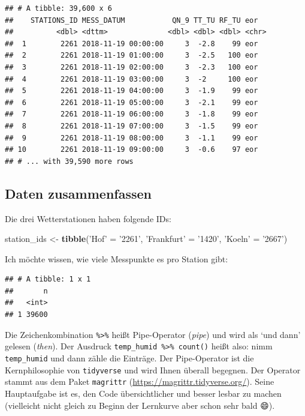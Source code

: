 \documentclass[]{book}
\newenvironment{Shaded}{\begin{snugshade}}{\end{snugshade}}
\newcommand{\KeywordTok}[1]{\textcolor[rgb]{0.13,0.29,0.53}{\textbf{#1}}}
\newcommand{\NormalTok}[1]{#1}
\newcommand{\OperatorTok}[1]{\textcolor[rgb]{0.81,0.36,0.00}{\textbf{#1}}}
\newcommand{\StringTok}[1]{\textcolor[rgb]{0.31,0.60,0.02}{#1}}
\begin{document}
\begin{verbatim}
## # A tibble: 39,600 x 6
##    STATIONS_ID MESS_DATUM           QN_9 TT_TU RF_TU eor  
##          <dbl> <dttm>              <dbl> <dbl> <dbl> <chr>
##  1        2261 2018-11-19 00:00:00     3  -2.8    99 eor  
##  2        2261 2018-11-19 01:00:00     3  -2.5   100 eor  
##  3        2261 2018-11-19 02:00:00     3  -2.3   100 eor  
##  4        2261 2018-11-19 03:00:00     3  -2     100 eor  
##  5        2261 2018-11-19 04:00:00     3  -1.9    99 eor  
##  6        2261 2018-11-19 05:00:00     3  -2.1    99 eor  
##  7        2261 2018-11-19 06:00:00     3  -1.8    99 eor  
##  8        2261 2018-11-19 07:00:00     3  -1.5    99 eor  
##  9        2261 2018-11-19 08:00:00     3  -1.1    99 eor  
## 10        2261 2018-11-19 09:00:00     3  -0.6    97 eor  
## # ... with 39,590 more rows
\end{verbatim}

\hypertarget{daten-zusammenfassen}{%
\subsection{Daten zusammenfassen}\label{daten-zusammenfassen}}

Die drei Wetterstationen haben folgende IDs:

\begin{Shaded}
\begin{Highlighting}[]
\NormalTok{station_ids <-}\StringTok{  }\KeywordTok{tibble}\NormalTok{(}\StringTok{'Hof'}\NormalTok{ =}\StringTok{ '2261'}\NormalTok{, }\StringTok{'Frankfurt'}\NormalTok{ =}\StringTok{ '1420'}\NormalTok{, }\StringTok{'Koeln'}\NormalTok{ =}\StringTok{ '2667'}\NormalTok{)}
\end{Highlighting}
\end{Shaded}

Ich möchte wissen, wie viele Messpunkte es pro Station gibt:

\begin{Shaded}
\end{Shaded}

\begin{verbatim}
## # A tibble: 1 x 1
##       n
##   <int>
## 1 39600
\end{verbatim}

Die Zeichenkombination \texttt{\%\textgreater{}\%} heißt Pipe-Operator (\emph{pipe}) und wird als `und dann' gelesen (\emph{then}). Der Ausdruck \texttt{temp\_humid\ \%\textgreater{}\%\ count()} heißt also: nimm \texttt{temp\_humid} und dann zähle die Einträge. Der Pipe-Operator ist die Kernphilosophie von \texttt{tidyverse} und wird Ihnen überall begegnen. Der Operator stammt aus dem Paket \texttt{magrittr} (\url{https://magrittr.tidyverse.org/}). Seine Hauptaufgabe ist es, den Code übersichtlicher und besser lesbar zu machen (vielleicht nicht gleich zu Beginn der Lernkurve aber schon sehr bald 😄).
\end{document}
